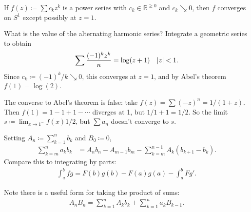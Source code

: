 \begin{lemma}

If \(f(z) \coloneqq\sum c_k z^k\) is a power series with
\(c_k \in {\mathbb{R}}^{\geq 0}\) and \(c_k\searrow 0\), then \(f\)
converges on \(S^1\) except possibly at \(z=1\).

\end{lemma}

\begin{example}

What is the value of the alternating harmonic series? Integrate a
geometric series to obtain
\begin{align*}
\sum {(-1)^k z^k \over n} = \log(z+1) && {\left\lvert {z} \right\rvert} < 1
.\end{align*}
Since \(c_k \coloneqq(-1)^k/k \searrow 0\), this converges at \(z=1\),
and by Abel's theorem \(f(1) = \log(2)\).

\end{example}

\begin{remark}

The converse to Abel's theorem is false: take
\(f(z) = \sum (-z)^n = 1/(1+z)\). Then \(f(1) = 1-1+1-\cdots\) diverges
at 1, but \(1/1+1 = 1/2\). So the limit
\(s\coloneqq\lim_{x\to 1^-} f(x) 1/2\), but \(\sum a_n\) doesn't
converge to \(s\).

\end{remark}

\begin{proposition}

Setting \(A_n \coloneqq\sum_{k=1}^n b_k\) and \(B_0 \coloneqq 0\),
\begin{align*}
\sum_{k=m}^n a_k b_k 
&= A_nb_n - A_{m-1} b_m - \sum_{k=m}^{n-1} A_k(b_{k+1} - b_{k})
.\end{align*}
Compare this to integrating by parts:
\begin{align*}
\int_a^b f g = F(b)g(b) - F(a)g(a) - \int_a^b Fg'
.\end{align*}

Note there is a useful form for taking the product of sums:
\begin{align*}
A_{n} B_{n}=\sum_{k=1}^{n} A_{k} b_{k}+\sum_{k=1}^{n} a_{k} B_{k-1}
.\end{align*}

\end{proposition}

